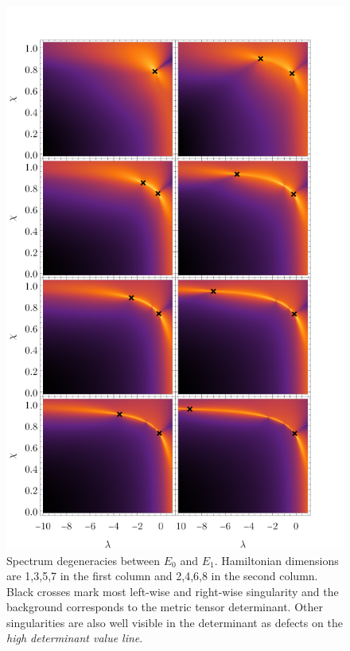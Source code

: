 \begin{figure}[H]
    \centering
    \includegraphics[scale=1.3]{../img/singularitiesPlots.pdf}
    \caption{Spectrum degeneracies between $E_0$ and $E_1$. Hamiltonian dimensions are 1,3,5,7 in the first column and 2,4,6,8 in the second column. Black crosses mark most left-wise and right-wise singularity and the background corresponds to the metric tensor determinant. Other singularities are also well visible in the determinant as defects on the \emph{high determinant value line}.}
    \label{fig:singularities3to10}    
\end{figure}









